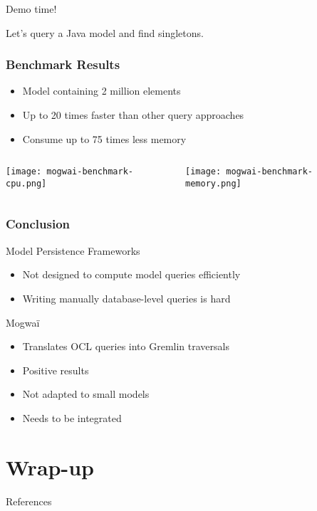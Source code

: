 \begin{frame}[standout]
  Demo time!

  Let's query a Java model and find singletons.
\end{frame}

\begin{frame}[c]\frametitle{Benchmark Results}

  \begin{itemize}
	\item Model containing 2 million elements
	\item Up to 20 times faster than other query approaches
	\item Consume up to 75 times less memory
  \end{itemize}
  \begin{columns}
	  \begin{column}{0.5\textwidth}
	    \begin{center}
	      \texttt{[image: mogwai-benchmark-cpu.png]}
	    \end{center}
	  \end{column}
	  \begin{column}{0.5\textwidth}
	    \begin{center}
	      \texttt{[image: mogwai-benchmark-memory.png]}
	    \end{center}
	  \end{column}
  \end{columns}

\end{frame}

\begin{frame}[c]\frametitle{Conclusion}
	\begin{block}{Model Persistence Frameworks}
	  \begin{itemize}
		\item Not designed to compute model queries efficiently
		\item Writing manually database-level queries is hard
	  \end{itemize}
	\end{block}

  \begin{block}{Mogwaï}
		\begin{itemize}
		\item Translates OCL queries into Gremlin traversals
		\item Positive results
		\item Not adapted to small models
		\item Needs to be integrated
	  \end{itemize}
  \end{block}
\end{frame}

\section{Wrap-up}

\begin{frame}[allowframebreaks]{References}
  
  
\end{frame}


